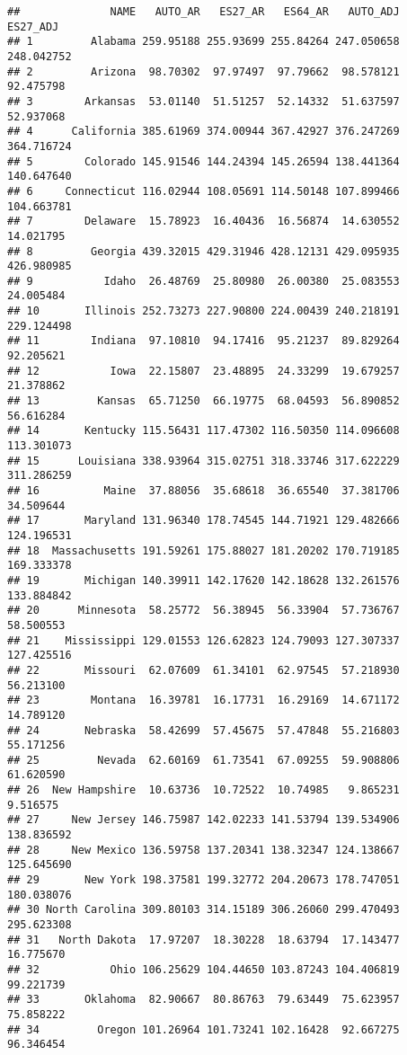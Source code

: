 \documentclass[
]{article}
\begin{document}
\begin{verbatim}
##              NAME   AUTO_AR   ES27_AR   ES64_AR   AUTO_ADJ   ES27_ADJ
## 1         Alabama 259.95188 255.93699 255.84264 247.050658 248.042752
## 2         Arizona  98.70302  97.97497  97.79662  98.578121  92.475798
## 3        Arkansas  53.01140  51.51257  52.14332  51.637597  52.937068
## 4      California 385.61969 374.00944 367.42927 376.247269 364.716724
## 5        Colorado 145.91546 144.24394 145.26594 138.441364 140.647640
## 6     Connecticut 116.02944 108.05691 114.50148 107.899466 104.663781
## 7        Delaware  15.78923  16.40436  16.56874  14.630552  14.021795
## 8         Georgia 439.32015 429.31946 428.12131 429.095935 426.980985
## 9           Idaho  26.48769  25.80980  26.00380  25.083553  24.005484
## 10       Illinois 252.73273 227.90800 224.00439 240.218191 229.124498
## 11        Indiana  97.10810  94.17416  95.21237  89.829264  92.205621
## 12           Iowa  22.15807  23.48895  24.33299  19.679257  21.378862
## 13         Kansas  65.71250  66.19775  68.04593  56.890852  56.616284
## 14       Kentucky 115.56431 117.47302 116.50350 114.096608 113.301073
## 15      Louisiana 338.93964 315.02751 318.33746 317.622229 311.286259
## 16          Maine  37.88056  35.68618  36.65540  37.381706  34.509644
## 17       Maryland 131.96340 178.74545 144.71921 129.482666 124.196531
## 18  Massachusetts 191.59261 175.88027 181.20202 170.719185 169.333378
## 19       Michigan 140.39911 142.17620 142.18628 132.261576 133.884842
## 20      Minnesota  58.25772  56.38945  56.33904  57.736767  58.500553
## 21    Mississippi 129.01553 126.62823 124.79093 127.307337 127.425516
## 22       Missouri  62.07609  61.34101  62.97545  57.218930  56.213100
## 23        Montana  16.39781  16.17731  16.29169  14.671172  14.789120
## 24       Nebraska  58.42699  57.45675  57.47848  55.216803  55.171256
## 25         Nevada  62.60169  61.73541  67.09255  59.908806  61.620590
## 26  New Hampshire  10.63736  10.72522  10.74985   9.865231   9.516575
## 27     New Jersey 146.75987 142.02233 141.53794 139.534906 138.836592
## 28     New Mexico 136.59758 137.20341 138.32347 124.138667 125.645690
## 29       New York 198.37581 199.32772 204.20673 178.747051 180.038076
## 30 North Carolina 309.80103 314.15189 306.26060 299.470493 295.623308
## 31   North Dakota  17.97207  18.30228  18.63794  17.143477  16.775670
## 32           Ohio 106.25629 104.44650 103.87243 104.406819  99.221739
## 33       Oklahoma  82.90667  80.86763  79.63449  75.623957  75.858222
## 34         Oregon 101.26964 101.73241 102.16428  92.667275  96.346454

\end{verbatim}
\end{document}
